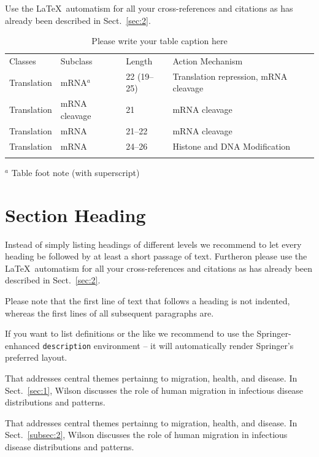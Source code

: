  Use the \LaTeX\ automatism for all your cross-refer\-ences and citations as has already been described in Sect.~\ref{sec:2}.
%
%
\begin{table}[!t]
\caption{Please write your table caption here}
\label{tab:1}       %
%
%
\begin{tabular}{p{2cm}p{2.4cm}p{2cm}p{4.9cm}}
\hline\noalign{\smallskip}
Classes & Subclass & Length & Action Mechanism  \\
\noalign{\smallskip}\svhline\noalign{\smallskip}
Translation & mRNA$^a$  & 22 (19--25) & Translation repression, mRNA cleavage\\
Translation & mRNA cleavage & 21 & mRNA cleavage\\
Translation & mRNA  & 21--22 & mRNA cleavage\\
Translation & mRNA  & 24--26 & Histone and DNA Modification\\
\noalign{\smallskip}\hline\noalign{\smallskip}
\end{tabular}
$^a$ Table foot note (with superscript)
\end{table}
%
\section{Section Heading}
\label{sec:3}
Instead of simply listing headings of different levels we recommend to let every heading be followed by at least a short passage of text. Furtheron please use the \LaTeX\ automatism for all your cross-references and citations as has already been described in Sect.~\ref{sec:2}.

Please note that the first line of text that follows a heading is not indented, whereas the first lines of all subsequent paragraphs are.

If you want to list definitions or the like we recommend to use the Springer-enhanced \verb|description| environment -- it will automatically render Springer's preferred layout.

\begin{description}[Type 1]
\item[Type 1]{That addresses central themes pertainng to migration, health, and disease. In Sect.~\ref{sec:1}, Wilson discusses the role of human migration in infectious disease distributions and patterns.}
\item[Type 2]{That addresses central themes pertainng to migration, health, and disease. In Sect.~\ref{subsec:2}, Wilson discusses the role of human migration in infectious disease distributions and patterns.}
\end{description}

